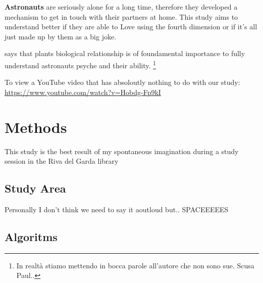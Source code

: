\documentclass[12pt]{article} %
\begin{document}

\textbf{Astronauts} %
are seriously alone for a long time, therefore they developed a mechanism to get in touch with their partners at home. This study aims to understand better if they are able to Love using the fourth dimension or if it's all just made up by them as a big joke. \cite{Berscheid2010} %
\citep{Berscheid2010} %
\smallskip



\citet{Paul2013} %
says that plants biological relationship is of foundamental importance to fully understand astronauts psyche and their ability. 
\footnote{In realtà stiamo mettendo in bocca parole all'autore che non sono sue. Scusa Paul..} %
\bigskip

To view a YouTube video that has absoloutly nothing to do with our study: 
\url{https://www.youtube.com/watch?v=Hobdg-Fp9kI} %

\newpage %

\section{Methods} %
This study is the best result of my spontaneous imagination during a study session in the Riva del Garda library 

\subsection{Study Area} %
Personally I don't think we need to say it aoutloud but.. SPACEEEEES

\subsection{Algoritms}
\end{document}
